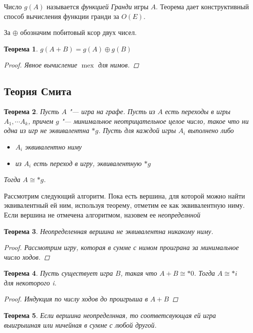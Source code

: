 \documentclass[12pt,a4paper]{article}
\theoremstyle{plain}
\newtheorem{thm}{Теорема}
\DeclareMathOperator{\mex}{mex}
\newcommand{\nim}[1]{*#1}
\begin{document}
Число $g(A)$ называется \emph{функцией Гранди} игры $A$. Теорема дает конструктивный 
способ вычисления функции гранди за $O(E)$.

За $\oplus$ обозначим побитовый ксор двух чисел.

\begin{thm}
$g(A+B) = g(A) \oplus g(B)$
\begin{proof}
Явное вычисление $\mex$ для нимов.
\end{proof}
\end{thm}

\subsection{Теория Смита}

\begin{thm}
Пусть $A$ "--- игра на графе. Пусть из $A$ есть переходы в игры $A_1, \cdots A_k$, причем 
$g$ "--- минимальное неотрицательное целое число, такое что ни одна из игр не эквивалентна $\nim{g}$.
Пусть для каждой игры $A_i$ выполнено либо
\begin{itemize}
\item $A_i$ эквивалентно ниму
\item из $A_i$ есть переход в игру, эквивалентную $\nim{g}$
\end{itemize}
Тогда $A \cong \nim{g}$.
\end{thm}

Рассмотрим следующий алгоритм. 
Пока есть вершина, для которой можно найти эквивалентный ей ним, используя теорему,
отметим ее как эквивалентную ниму.
Если вершина не отмечена алгоритмом, назовем ее \emph{неопределнной}

\begin{thm}
Неопределенная вершина не эквивалентна никакому ниму.
\begin{proof}
Рассмотрим игру, которая в сумме с нимом проиграна за минимальное число ходов.
\end{proof}
\end{thm}

\begin{thm}
Пусть существует игра $B$, такая что $A + B \cong \nim{0}$. Тогда 
$A \cong \nim{i}$ для некоторого i.
\begin{proof}
Индукция по числу ходов до проигрыша в $A+B$
\end{proof}
\end{thm}

\begin{thm}
Если вершина неопределнная, то соответсвующая ей игра выигрышная или ничейная в сумме с любой другой.
\end{thm}
\end{document}
